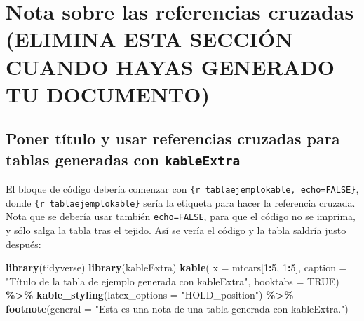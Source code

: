 \documentclass[spanish]{article}
\newenvironment{Shaded}{\begin{snugshade}}{\end{snugshade}}
\newcommand{\AttributeTok}[1]{\textcolor[rgb]{0.13,0.29,0.53}{#1}}
\newcommand{\ConstantTok}[1]{\textcolor[rgb]{0.56,0.35,0.01}{#1}}
\newcommand{\DecValTok}[1]{\textcolor[rgb]{0.00,0.00,0.81}{#1}}
\newcommand{\FunctionTok}[1]{\textcolor[rgb]{0.13,0.29,0.53}{\textbf{#1}}}
\newcommand{\NormalTok}[1]{#1}
\newcommand{\SpecialCharTok}[1]{\textcolor[rgb]{0.81,0.36,0.00}{\textbf{#1}}}
\newcommand{\StringTok}[1]{\textcolor[rgb]{0.31,0.60,0.02}{#1}}
\begin{document}
\section{Nota sobre las referencias cruzadas (ELIMINA ESTA SECCIÓN
CUANDO HAYAS GENERADO TU
DOCUMENTO)}\label{nota-sobre-las-referencias-cruzadas-elimina-esta-secciuxf3n-cuando-hayas-generado-tu-documento}

\subsection{\texorpdfstring{Poner título y usar referencias cruzadas
para tablas generadas con
\texttt{kableExtra}}{Poner título y usar referencias cruzadas para tablas generadas con kableExtra}}\label{poner-tuxedtulo-y-usar-referencias-cruzadas-para-tablas-generadas-con-kableextra}

El bloque de código debería comenzar con
\texttt{\{r\ tablaejemplokable,\ echo=FALSE\}}, donde
\texttt{\{r\ tablaejemplokable\}} sería la etiqueta para hacer la
referencia cruzada. Nota que se debería usar también
\texttt{echo=FALSE}, para que el código no se imprima, y sólo salga la
tabla tras el tejido. Así se vería el código y la tabla saldría justo
después:

\begin{Shaded}
\begin{Highlighting}[]
\FunctionTok{library}\NormalTok{(tidyverse)}
\FunctionTok{library}\NormalTok{(kableExtra)}
\FunctionTok{kable}\NormalTok{(}
  \AttributeTok{x =}\NormalTok{ mtcars[}\DecValTok{1}\SpecialCharTok{:}\DecValTok{5}\NormalTok{, }\DecValTok{1}\SpecialCharTok{:}\DecValTok{5}\NormalTok{],}
  \AttributeTok{caption =} \StringTok{"Título de la tabla de ejemplo generada con kableExtra"}\NormalTok{,}
  \AttributeTok{booktabs =} \ConstantTok{TRUE}\NormalTok{) }\SpecialCharTok{\%\textgreater{}\%}
  \FunctionTok{kable\_styling}\NormalTok{(}\AttributeTok{latex\_options =} \StringTok{"HOLD\_position"}\NormalTok{) }\SpecialCharTok{\%\textgreater{}\%}
  \FunctionTok{footnote}\NormalTok{(}\AttributeTok{general =} \StringTok{"Esta es una nota de una tabla generada con kableExtra."}\NormalTok{)}
\end{Highlighting}
\end{Shaded}
\end{document}
